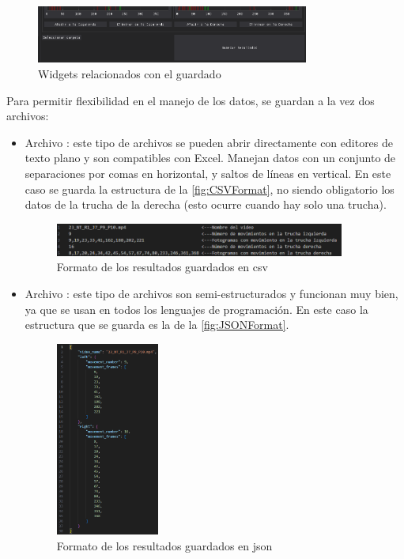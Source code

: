 \begin{figure}[H]
    \centering
    \includegraphics[width=0.8\textwidth]{images/6/6.5/Guardar.png}
    \caption{Widgets relacionados con el guardado}
    \label{fig:Guardar}
\end{figure}

Para permitir flexibilidad en el manejo de los datos, se guardan a la vez dos archivos:
\begin{itemize}
    \item Archivo : este tipo de archivos se pueden abrir directamente con editores de texto plano y son compatibles con Excel.\newline
    Manejan datos con un conjunto de separaciones por comas en horizontal, y saltos de líneas en vertical. En este caso se guarda la estructura de la \autoref{fig:CSVFormat}, no siendo obligatorio los datos 
    de la trucha de la derecha (esto ocurre cuando hay solo una trucha).
    \begin{figure}[H]
        \centering
        \includegraphics[width=0.9\textwidth]{images/6/6.5/csvFormat.png}
        \caption{Formato de los resultados guardados en \acrshort{csv}}
        \label{fig:CSVFormat}
    \end{figure}
    \item Archivo : este tipo de archivos son semi-estructurados y funcionan muy bien, ya que se usan en todos los lenguajes de programación. En este caso la estructura que se guarda es 
    la de la \autoref{fig:JSONFormat}.
    \begin{figure}[H]
        \centering
        \includegraphics[width=0.32\textwidth]{images/6/6.5/jsonFormat.png}
        \caption{Formato de los resultados guardados en \acrshort{json}}
        \label{fig:JSONFormat}
    \end{figure}
\end{itemize}

